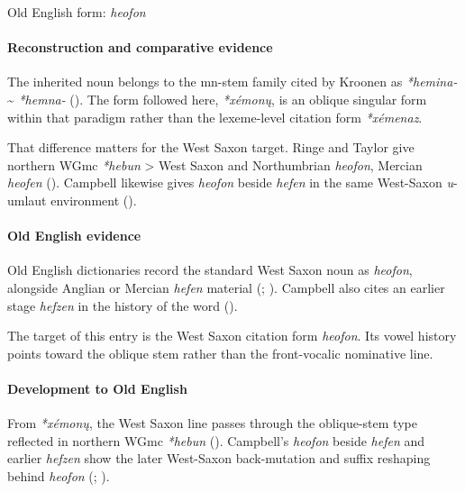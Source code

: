 \documentclass[
  british,
  a4paper,
]{article}
\begin{document}
Old English form: \emph{heofon}

\paragraph{Reconstruction and comparative
evidence}\label{reconstruction-and-comparative-evidence-47}

The inherited noun belongs to the mn-stem family cited by Kroonen as
\emph{*hemina-} \textasciitilde{} \emph{*hemna-}
(). The form followed here,
\emph{*xémonų}, is an oblique singular form within that paradigm rather
than the lexeme-level citation form \emph{*xémenaz}.

That difference matters for the West Saxon target. Ringe and Taylor give
northern WGmc \emph{*hebun} \textgreater{} West Saxon and Northumbrian
\emph{heofon}, Mercian \emph{heofen}
(). Campbell
likewise gives \emph{heofon} beside \emph{hefen} in the same West-Saxon
\emph{u}-umlaut environment ().

\paragraph{Old English evidence}\label{old-english-evidence-47}

Old English dictionaries record the standard West Saxon noun as
\emph{heofon}, alongside Anglian or Mercian \emph{hefen} material
(;
).
Campbell also cites an earlier stage \emph{hefzen} in the history of the
word ().

The target of this entry is the West Saxon citation form \emph{heofon}.
Its vowel history points toward the oblique stem rather than the
front-vocalic nominative line.

\paragraph{Development to Old
English}\label{development-to-old-english-47}

From \emph{*xémonų}, the West Saxon line passes through the oblique-stem
type reflected in northern WGmc \emph{*hebun}
(). Campbell's
\emph{heofon} beside \emph{hefen} and earlier \emph{hefzen} show the
later West-Saxon back-mutation and suffix reshaping behind \emph{heofon}
(;
).
\end{document}
